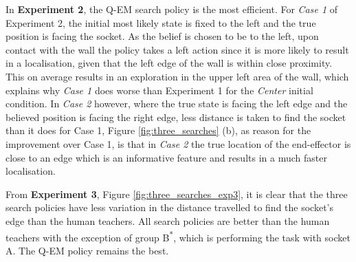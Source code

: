 In \textbf{Experiment 2}, the Q-EM search policy is the most efficient. For \textit{Case 1} of Experiment 2, the initial most 
likely state is fixed to the left and the true position is facing the socket. As the belief is chosen to be 
to the left, upon contact with the wall the policy takes a left action since it is more likely to result in a localisation, given 
that the left edge of the wall is within close proximity. 
This on average results in an exploration in the upper left area of the wall, which explains why \textit{Case 1} does worse than Experiment 1
for the \textit{Center} initial condition. In \textit{Case 2} however, where the true state is facing the left 
edge and the believed position is facing the right edge, less distance is taken to find the socket than it does for Case 1, 
Figure \ref{fig:three_searches} (b), as reason for the improvement over Case 1, is that in \textit{Case 2} the true location of 
the end-effector is close to an edge which is an informative feature and results in a much faster localisation.

From \textbf{Experiment 3}, Figure \ref{fig:three_searches_exp3}, it is clear that the three search policies have 
less variation in the distance travelled to find the socket's edge than the human teachers. 
All search policies are better than the human teachers with the exception of group B\textsuperscript{*}, 
which is performing the task with socket A. The Q-EM policy remains the best. 

